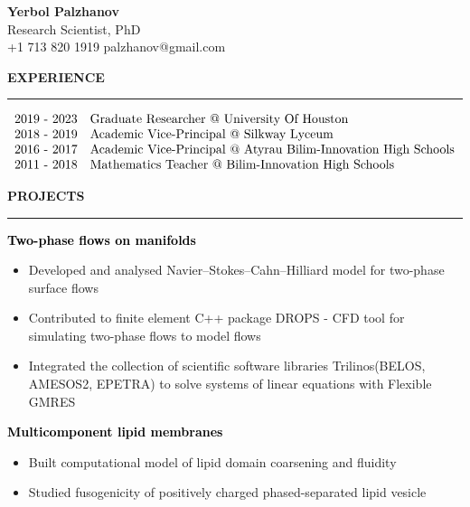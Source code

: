 \documentclass[10pt,letterpaper]{letter}
\newcommand{\gsect}[1]{\textcolor{codepurple}{\textbf{{\Large \uppercase{#1} }}} \\ \hrule}
\newcommand{\gsubsect}[1]{\textcolor{black}{\textbf{{\large #1 }}} }
\begin{document}
	\begin{center}
\textbf{	{\large Yerbol Palzhanov}}\\ Research Scientist, PhD\\
+1 713 820 1919 \quad palzhanov@gmail.com
	\end{center}


\gsect{Experience}


$\begin{array}{r l }
\text{2019 - 2023} & \text{Graduate Researcher @ University Of Houston} \\
\text{2018 - 2019} & \text{Academic Vice-Principal @ Silkway Lyceum} \\
\text{2016 - 2017} & \text{Academic Vice-Principal @ Atyrau Bilim-Innovation High Schools} \\
\text{2011 - 2018} & \text{Mathematics Teacher @ Bilim-Innovation High Schools}  
\end{array}$



\gsect{Projects}

\gsubsect{Two-phase flows on manifolds}
\begin{itemize}
	\item {Developed and analysed Navier–Stokes–Cahn–Hilliard model for two-phase surface flows}
	\item {Contributed to finite element C++ package DROPS - CFD tool for simulating two-phase flows  to model flows}
	\item {Integrated the collection of scientific software libraries Trilinos(BELOS, AMESOS2, EPETRA) to solve systems of linear equations with Flexible GMRES}
\end{itemize}
\gsubsect{Multicomponent lipid membranes}
\begin{itemize}
	\item {Built computational model of lipid domain coarsening and fluidity }
	\item {Studied fusogenicity of positively charged phased-separated lipid vesicle }
	
\end{itemize}
\end{document}
